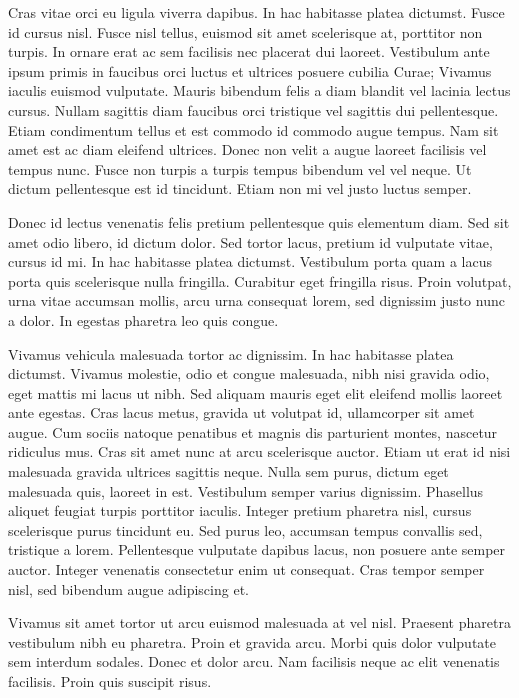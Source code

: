\documentclass[a4paper]{article}
\begin{document}
Cras vitae orci eu ligula viverra dapibus. In hac habitasse platea dictumst. Fusce id cursus nisl. Fusce nisl tellus, euismod sit amet scelerisque at, porttitor non turpis. In ornare erat ac sem facilisis nec placerat dui laoreet. Vestibulum ante ipsum primis in faucibus orci luctus et ultrices posuere cubilia Curae; Vivamus iaculis euismod vulputate. Mauris bibendum felis a diam blandit vel lacinia lectus cursus. Nullam sagittis diam faucibus orci tristique vel sagittis dui pellentesque. Etiam condimentum tellus et est commodo id commodo augue tempus. Nam sit amet est ac diam eleifend ultrices. Donec non velit a augue laoreet facilisis vel tempus nunc. Fusce non turpis a turpis tempus bibendum vel vel neque. Ut dictum pellentesque est id tincidunt. Etiam non mi vel justo luctus semper.

Donec id lectus venenatis felis pretium pellentesque quis elementum diam. Sed sit amet odio libero, id dictum dolor. Sed tortor lacus, pretium id vulputate vitae, cursus id mi. In hac habitasse platea dictumst. Vestibulum porta quam a lacus porta quis scelerisque nulla fringilla. Curabitur eget fringilla risus. Proin volutpat, urna vitae accumsan mollis, arcu urna consequat lorem, sed dignissim justo nunc a dolor. In egestas pharetra leo quis congue.

Vivamus vehicula malesuada tortor ac dignissim. In hac habitasse platea dictumst. Vivamus molestie, odio et congue malesuada, nibh nisi gravida odio, eget mattis mi lacus ut nibh. Sed aliquam mauris eget elit eleifend mollis laoreet ante egestas. Cras lacus metus, gravida ut volutpat id, ullamcorper sit amet augue. Cum sociis natoque penatibus et magnis dis parturient montes, nascetur ridiculus mus. Cras sit amet nunc at arcu scelerisque auctor. Etiam ut erat id nisi malesuada gravida ultrices sagittis neque. Nulla sem purus, dictum eget malesuada quis, laoreet in est. Vestibulum semper varius dignissim. Phasellus aliquet feugiat turpis porttitor iaculis. Integer pretium pharetra nisl, cursus scelerisque purus tincidunt eu. Sed purus leo, accumsan tempus convallis sed, tristique a lorem. Pellentesque vulputate dapibus lacus, non posuere ante semper auctor. Integer venenatis consectetur enim ut consequat. Cras tempor semper nisl, sed bibendum augue adipiscing et.

Vivamus sit amet tortor ut arcu euismod malesuada at vel nisl. Praesent pharetra vestibulum nibh eu pharetra. Proin et gravida arcu. Morbi quis dolor vulputate sem interdum sodales. Donec et dolor arcu. Nam facilisis neque ac elit venenatis facilisis. Proin quis suscipit risus.
\end{document}
